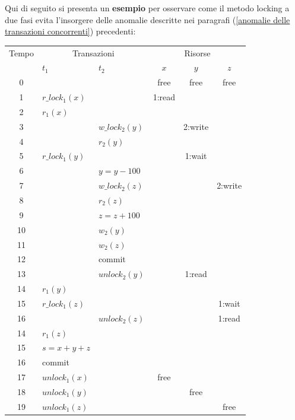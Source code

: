 \documentclass[a4paper]{article}
\begin{document}
	\noindent
	Qui di seguito si presenta un \textcolor{Green4}{\textbf{esempio}} per osservare come il metodo locking a due fasi evita l'insorgere delle anomalie descritte nei paragrafi (\ref{anomalie delle transazioni concorrenti}) precedenti:
	\begin{table}[!htbp]
		\centering
		\begin{tabular}{@{} c l l c c c @{}}
			\toprule
			Tempo & \multicolumn{2}{c}{Transazioni} & \multicolumn{3}{c}{Risorse} \\ \cmidrule{2-6}
				  & $t_{1}$ & $t_{2}$ & $x$ & $y$ & $z$ \\
			\midrule
			0	&								&								& free	& free		& free		\\
			1	& $r\_lock_{1}\left(x\right)$	&								& 1:read& 			&			\\
			2	& $r_{1}\left(x\right)$			&								& 		&			&			\\
			3	& 								& $w\_lock_{2}\left(y\right)$	& 		& 2:write	&			\\
			4	&								& $r_{2}\left(y\right)$ 		&		&			&			\\
			5	& $r\_lock_{1}\left(y\right)$	& 								&		& 1:wait	&			\\
			6	& 								& $y = y - 100$ 				&		&			&			\\
			7	& 								& $w\_lock_{2}\left(z\right)$ 	&		&			& 2:write	\\
			8	&								& $r_{2}\left(z\right)$			&		&			&			\\
			9	& 								& $z = z + 100$ 				&		&			&			\\
			10	& 								& $w_{2}\left(y\right)$ 		&		&			&			\\
			11	& 								& $w_{2}\left(z\right)$ 		&		&			&			\\
			12	& 								& \textsf{commit} 				&		&			&			\\
			13	& 								& $unlock_{2}\left(y\right)$	&		& 1:read	&			\\
			14	& $r_{1}\left(y\right)$			& 								&		&			&			\\
			15	& $r\_lock_{1}\left(z\right)$	& 								&		&			& 1:wait	\\
			16  &								& $unlock_{2}\left(z\right)$ 	&		&			& 1:read	\\
			14	& $r_{1}\left(z\right)$			& 								&		&			&			\\
			15	& $s = x+y+z$					& 								&		&			&			\\
			16	& \textsf{commit}				& 								&		&			&			\\
			17	& $unlock_{1}\left(x\right)$	& 								& free	&			&			\\
			18	& $unlock_{1}\left(y\right)$	& 								&		& free		&			\\
			19	& $unlock_{1}\left(z\right)$	& 								&		&			& free		\\
			\bottomrule
		\end{tabular}
	\end{table}
	
\end{document}
